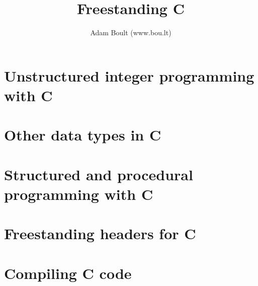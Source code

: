 \documentclass[oneside]{book}
\begin{document}
\author{Adam Boult (www.bou.lt)}
\title{Freestanding C}
\maketitle

\setcounter{tocdepth}{0}
\tableofcontents



\part{Unstructured integer programming with C}











\part{Other data types in C}






\part{Structured and procedural programming with C}








\part{Freestanding headers for C}











\part{Compiling C code}

\end{document}
